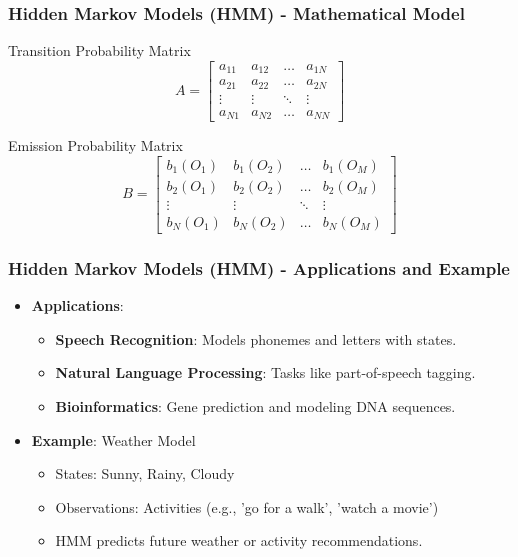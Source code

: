 \documentclass[aspectratio=169]{beamer}
\begin{document}
\begin{frame}[fragile]
    \frametitle{Hidden Markov Models (HMM) - Mathematical Model}
    \begin{block}{Transition Probability Matrix}
        \[
        A = \begin{bmatrix}
        a_{11} & a_{12} & \ldots & a_{1N} \\
        a_{21} & a_{22} & \ldots & a_{2N} \\
        \vdots & \vdots & \ddots & \vdots \\
        a_{N1} & a_{N2} & \ldots & a_{NN}
        \end{bmatrix}
        \]
    \end{block}

    \begin{block}{Emission Probability Matrix}
        \[
        B = \begin{bmatrix}
        b_{1}(O_1) & b_{1}(O_2) & \ldots & b_{1}(O_M) \\
        b_{2}(O_1) & b_{2}(O_2) & \ldots & b_{2}(O_M) \\
        \vdots & \vdots & \ddots & \vdots \\
        b_{N}(O_1) & b_{N}(O_2) & \ldots & b_{N}(O_M)
        \end{bmatrix}
        \]
    \end{block}
\end{frame}

\begin{frame}[fragile]
    \frametitle{Hidden Markov Models (HMM) - Applications and Example}
    \begin{itemize}
        \item \textbf{Applications}:
        \begin{itemize}
            \item \textbf{Speech Recognition}: Models phonemes and letters with states.
            \item \textbf{Natural Language Processing}: Tasks like part-of-speech tagging.
            \item \textbf{Bioinformatics}: Gene prediction and modeling DNA sequences.
        \end{itemize}

        \item \textbf{Example}: Weather Model
        \begin{itemize}
            \item States: Sunny, Rainy, Cloudy
            \item Observations: Activities (e.g., 'go for a walk', 'watch a movie')
            \item HMM predicts future weather or activity recommendations.
        \end{itemize}
    \end{itemize}
\end{frame}
\end{document}
